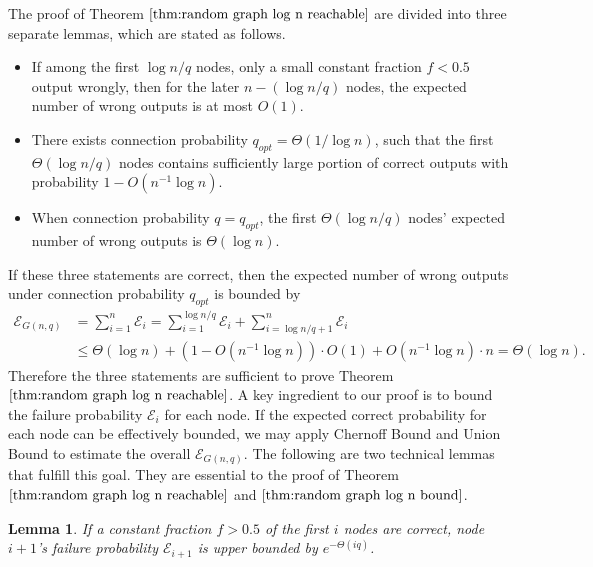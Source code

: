 \documentclass[a4paper,UKenglish]{lipics}
\newtheorem{lem}[thm]{Lemma}
\theoremstyle{definition}
\begin{document}
The proof of Theorem $\ref{thm:random graph log n reachable}$ are divided into three separate lemmas, which are stated as follows.
\begin{itemize}
\item If among the first $\log n/q$ nodes, 
		only a small constant fraction $f < 0.5$ output wrongly, 
		then for the later $n - (\log n/q)$ nodes, the expected number of wrong outputs is at most $O(1)$.
\item There exists connection probability $q_{opt} = \Theta(1/\log n)$, such that the first $\Theta(\log n/q)$ nodes 
		contains sufficiently large portion of correct outputs with probability $1 - O(n^{-1}\log n)$.
\item When connection probability $q = q_{opt}$, the first $\Theta(\log n/q)$ nodes' expected number of wrong outputs is $\Theta(\log n)$.
\end{itemize}
If these three statements are correct, then the expected number of wrong outputs under connection probability $q_{opt}$ is bounded by
\begin{equation}
\begin{aligned}
\label{equ:bound2}
	\mathcal{E}_{G(n,q)}
& =
	\sum_{i=1}^{n}	\mathcal{E}_i
	=
	\sum_{i=1}^{\log n/q}	\mathcal{E}_i + \sum_{i=\log n/q + 1}^{n}	\mathcal{E}_i
\\
& \le
	\Theta(\log n) + (1 - O(n^{-1}\log n))\cdot O(1) + O(n^{-1}\log n)\cdot n
	=
	\Theta(\log n).
\end{aligned}
\end{equation}
Therefore the three statements are sufficient to prove Theorem $\ref{thm:random graph log n reachable}$.
A key ingredient to our proof is to bound the failure probability $\mathcal{E}_i$ for each node.
If the expected correct probability for each node can be effectively bounded, 
	we may apply Chernoff Bound and Union Bound to estimate the overall $\mathcal{E}_{G(n,q)}$.
The following are two technical lemmas that fulfill this goal.
They are essential to the proof of Theorem $\ref{thm:random graph log n reachable}$ 
	and $\ref{thm:random graph log n bound}$.

\begin{lem} 
\label {lem:failurefori}
If a constant fraction $f > 0.5$ of the first $i$ nodes are correct, 
	node $i+1$'s failure probability $\mathcal{E}_{i+1}$ is upper bounded by $e^{-\Theta(iq)}$. 
\end{lem}
\end{document}
